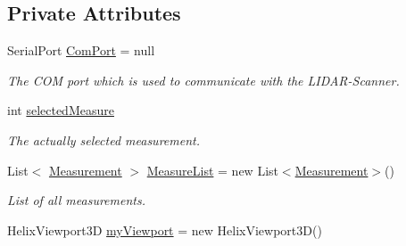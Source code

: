 \subsection*{Private Attributes}
\begin{DoxyCompactItemize}
\item 
Serial\+Port \hyperlink{class_l_i_d_a_r___controller_1_1_main_window_ae8b01d789601ddbc234ede8a0b43eb7b}{Com\+Port} = null\hypertarget{class_l_i_d_a_r___controller_1_1_main_window_ae8b01d789601ddbc234ede8a0b43eb7b}{}\label{class_l_i_d_a_r___controller_1_1_main_window_ae8b01d789601ddbc234ede8a0b43eb7b}

\begin{DoxyCompactList}\small\item\em The C\+OM port which is used to communicate with the L\+I\+D\+A\+R-\/\+Scanner. \end{DoxyCompactList}\item 
int \hyperlink{class_l_i_d_a_r___controller_1_1_main_window_a01f677b33ad15d2f0cdf8df1c64cd0e2}{selected\+Measure}\hypertarget{class_l_i_d_a_r___controller_1_1_main_window_a01f677b33ad15d2f0cdf8df1c64cd0e2}{}\label{class_l_i_d_a_r___controller_1_1_main_window_a01f677b33ad15d2f0cdf8df1c64cd0e2}

\begin{DoxyCompactList}\small\item\em The actually selected measurement. \end{DoxyCompactList}\item 
List$<$ \hyperlink{class_l_i_d_a_r___controller_1_1_measurement}{Measurement} $>$ \hyperlink{class_l_i_d_a_r___controller_1_1_main_window_add7555b1a79fa1c17cd18dcf98859b9c}{Measure\+List} = new List$<$\hyperlink{class_l_i_d_a_r___controller_1_1_measurement}{Measurement}$>$()\hypertarget{class_l_i_d_a_r___controller_1_1_main_window_add7555b1a79fa1c17cd18dcf98859b9c}{}\label{class_l_i_d_a_r___controller_1_1_main_window_add7555b1a79fa1c17cd18dcf98859b9c}

\begin{DoxyCompactList}\small\item\em List of all measurements. \end{DoxyCompactList}\item 
Helix\+Viewport3D \hyperlink{class_l_i_d_a_r___controller_1_1_main_window_a4b0350fc0b7116a0d744ee8e489ab34a}{my\+Viewport} = new Helix\+Viewport3D()\hypertarget{class_l_i_d_a_r___controller_1_1_main_window_a4b0350fc0b7116a0d744ee8e489ab34a}{}\label{class_l_i_d_a_r___controller_1_1_main_window_a4b0350fc0b7116a0d744ee8e489ab34a}


\end{DoxyCompactItemize}

